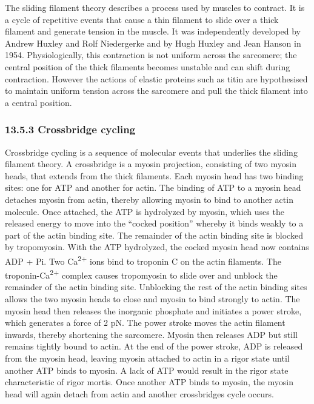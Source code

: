 The sliding filament theory describes a process used by muscles to
contract. It is a cycle of repetitive events that cause a thin filament
to slide over a thick filament and generate tension in the muscle. It
was independently developed by Andrew Huxley and Rolf Niedergerke and by
Hugh Huxley and Jean Hanson in 1954. Physiologically, this contraction
is not uniform across the sarcomere; the central position of the thick
filaments becomes unstable and can shift during contraction. However the
actions of elastic proteins such as titin are hypothesised to maintain
uniform tension across the sarcomere and pull the thick filament into a
central position.

\hypertarget{crossbridge-cycling}{%
\subsubsection{\texorpdfstring{{13.5.3} Crossbridge
cycling}{13.5.3 Crossbridge cycling}}\label{crossbridge-cycling}}

Crossbridge cycling is a sequence of molecular events that underlies the
sliding filament theory. A crossbridge is a myosin projection,
consisting of two myosin heads, that extends from the thick filaments.
Each myosin head has two binding sites: one for ATP and another for
actin. The binding of ATP to a myosin head detaches myosin from actin,
thereby allowing myosin to bind to another actin molecule. Once
attached, the ATP is hydrolyzed by myosin, which uses the released
energy to move into the ``cocked position'' whereby it binds weakly to a
part of the actin binding site. The remainder of the actin binding site
is blocked by tropomyosin. With the ATP hydrolyzed, the cocked myosin
head now contains ADP + Pi. Two Ca\textsuperscript{2+} ions bind to
troponin C on the actin filaments. The troponin-Ca\textsuperscript{2+}
complex causes tropomyosin to slide over and unblock the remainder of
the actin binding site. Unblocking the rest of the actin binding sites
allows the two myosin heads to close and myosin to bind strongly to
actin. The myosin head then releases the inorganic phosphate and
initiates a power stroke, which generates a force of 2 pN. The power
stroke moves the actin filament inwards, thereby shortening the
sarcomere. Myosin then releases ADP but still remains tightly bound to
actin. At the end of the power stroke, ADP is released from the myosin
head, leaving myosin attached to actin in a rigor state until another
ATP binds to myosin. A lack of ATP would result in the rigor state
characteristic of rigor mortis. Once another ATP binds to myosin, the
myosin head will again detach from actin and another crossbridges cycle
occurs.

